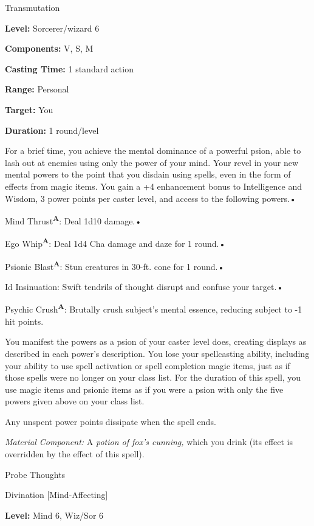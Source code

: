 \documentclass{article}
\begin{document}
Transmutation

\textbf{Level:} Sorcerer/wizard 6

\textbf{Components:} V, S, M

\textbf{Casting Time:} 1 standard action

\textbf{Range:} Personal

\textbf{Target:} You

\textbf{Duration:} 1 round/level

For a brief time, you achieve the mental dominance of a powerful psion, able to 
lash out at enemies using only the power of your mind. Your revel in your new mental 
powers to the point that you disdain using spells, even in the form of effects 
from magic items. You gain a +4 enhancement bonus to Intelligence and Wisdom, 3 
power points per caster level, and access to the following powers.• 

\parindent=3pt
Mind Thrust\textsuperscript{\textbf{A}}: Deal 1d10 damage.• 

Ego Whip\textsuperscript{\textbf{A}}: Deal 1d4 Cha damage and daze for 1 round.• 

Psionic Blast\textsuperscript{\textbf{A}}: Stun creatures in 30-ft. cone for 1 
round.• 

Id Insinuation: Swift tendrils of thought disrupt and confuse your target.• 

\parindent=7pt
Psychic Crush\textsuperscript{\textbf{A}}: Brutally crush subject's mental essence, 
reducing subject to -1 hit points.

\parindent=0pt
You manifest the powers as a psion of your caster level does, creating displays 
as described in each power's description. You lose your spellcasting ability, including 
your ability to use spell activation or spell completion magic items, just as if 
those spells were no longer on your class list. For the duration of this spell, 
you use magic items and psionic items as if you were a psion with only the five 
powers given above on your class list.

Any unspent power points dissipate when the spell ends.

\textit{Material Component: }A \textit{potion of fox's cunning, }which you drink 
(its effect is overridden by the effect of this spell).

\vspace{12pt}
Probe Thoughts

Divination [Mind-Affecting]

\textbf{Level:} Mind 6, Wiz/Sor 6
\end{document}
